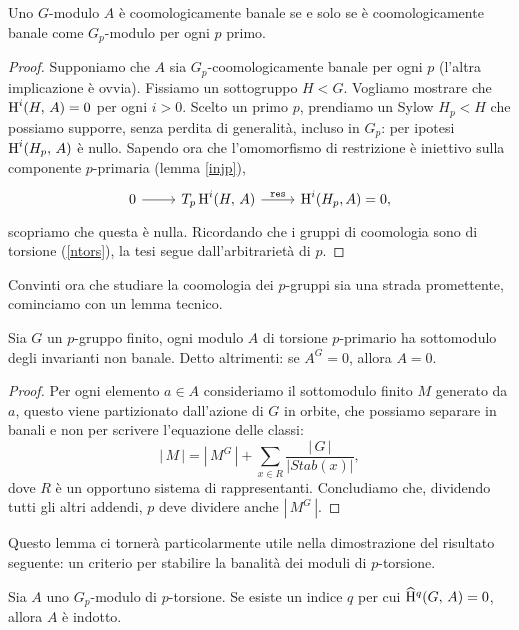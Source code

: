 \begin{lemma}\label{banSylow}
	Uno $ G $-modulo $ A $ è coomologicamente banale se e solo se è coomologicamente banale come $ G_p $-modulo per ogni $ p $ primo.
\end{lemma}
\begin{proof}
	Supponiamo che $ A $ sia $ G_p $-coomologicamente banale per ogni $ p $ (l'altra implicazione è ovvia). Fissiamo un sottogruppo $ H < G $. Vogliamo mostrare che
	$  \operatorname{H}^i(H, \, A) = 0 $ per ogni $ i > 0 $. Scelto un primo $ p $, prendiamo un Sylow $ H_p < H $ che possiamo supporre, senza perdita di generalità, incluso in $ G_p $: per ipotesi $ \operatorname{H}^i(H_p, \, A) $ è nullo.
	Sapendo ora che l'omomorfismo di restrizione è iniettivo sulla componente $ p $-primaria (lemma \ref{injp}),
	$$ \begin{tikzcd}
	0 \rar & T_p\HH^i(H, \, A) \rar["\Res"] & \HH^i(H_p, A) = 0,
	\end{tikzcd}  $$
	scopriamo che questa è nulla. Ricordando che i gruppi di coomologia sono di torsione (\ref{ntors}), la tesi segue dall'arbitrarietà di $ p $.
\end{proof}

Convinti ora che studiare la coomologia dei $ p $-gruppi sia una strada promettente, 
cominciamo con un lemma tecnico.

\begin{lemma}\label{ban1}
	Sia $ G $ un $ p $-gruppo finito, ogni modulo $ A $ di torsione $ p $-primario ha sottomodulo degli invarianti non banale. Detto altrimenti: se $ A^G = 0 $, allora $ A = 0 $.
\end{lemma}
\begin{proof}
	Per ogni elemento $ a \in A $ consideriamo il sottomodulo finito $ M $ generato da $ a $, questo viene partizionato dall'azione di $ G $ in orbite, che possiamo separare in banali e non per scrivere l'equazione delle classi:
	\[ |\,M\,| = |\, M^G\,| +\sum_{x \in R} \frac{|\,G\,|}{|Stab(x)|},  \]
	dove $ R $ è un opportuno sistema di rappresentanti. Concludiamo che, dividendo tutti gli altri addendi, $ p $ deve dividere anche $ |\, M^G \, | $.
\end{proof}

Questo lemma ci tornerà particolarmente utile nella dimostrazione del risultato seguente: un criterio per stabilire la banalità dei moduli di $ p $-torsione.

\begin{proposition} \label{ban2}
	Sia $ A $ uno $ G_p $-modulo di $ p $-torsione.
	Se esiste un indice $ q $ per cui $ \operatorname{\widehat{H}^\mathnormal{q}}(G, \, A) = 0 $, allora $ A $ è indotto.
\end{proposition}


